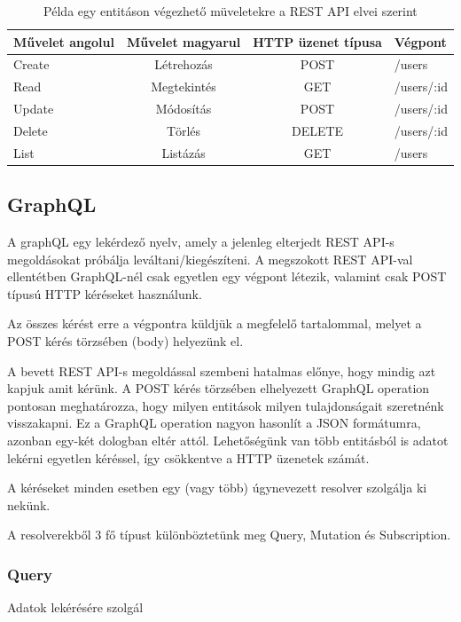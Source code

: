 \begin{table}[ht]
	\footnotesize
	\centering
	\begin{tabular}{ l c c l }
		\toprule
		Művelet angolul & Művelet magyarul & HTTP üzenet típusa & Végpont \\
		\midrule
		Create & Létrehozás & POST & /users \\
		Read & Megtekintés & GET & /users/:id \\
		Update & Módosítás  & POST & /users/:id \\
		Delete & Törlés  &  DELETE & /users/:id \\
		List & Listázás  & GET & /users \\
		\bottomrule
	\end{tabular}
	\caption{Példa egy entitáson végezhető müveletekre a REST API elvei szerint}
	\label{tab:RESTTable}
\end{table}


\subsection{GraphQL}

A graphQL egy lekérdező nyelv, amely a jelenleg elterjedt REST API-s megoldásokat próbálja leváltani/kiegészíteni. A megszokott REST API-val ellentétben GraphQL-nél csak egyetlen egy végpont létezik, valamint csak POST típusú HTTP kéréseket használunk. 

Az összes kérést erre a végpontra küldjük a megfelelő tartalommal, melyet a POST kérés törzsében (body) helyezünk el.

A bevett REST API-s megoldással szembeni hatalmas előnye, hogy mindig azt kapjuk amit kérünk. A POST kérés törzsében elhelyezett GraphQL operation pontosan meghatározza, hogy milyen entitások milyen tulajdonságait szeretnénk visszakapni. Ez a GraphQL operation nagyon hasonlít a JSON formátumra, azonban egy-két dologban eltér attól. Lehetőségünk van több entitásból is adatot lekérni egyetlen kéréssel, így csökkentve a HTTP üzenetek számát.

A kéréseket minden esetben egy (vagy több) úgynevezett resolver szolgálja ki nekünk. 

A resolverekből 3 fő típust különböztetünk meg Query, Mutation és Subscription.

\subsubsection{Query}
Adatok lekérésére szolgál
  
